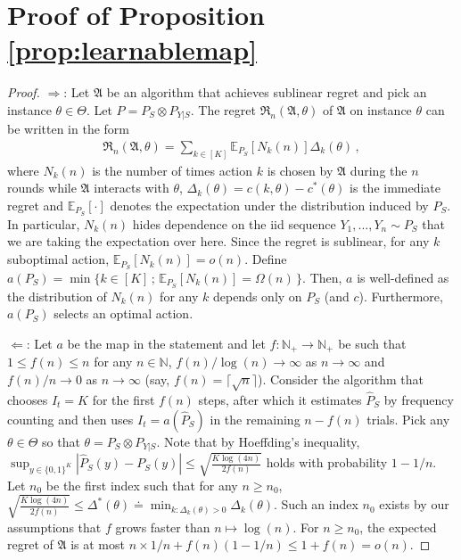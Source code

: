 \documentclass[11pt]{article} %
\newcommand{\N}{\mathbb{N}}
\newcommand{\Alg}{\mathfrak{A}}
\newcommand{\EEi}[2]{\mathbb{E}_{#1}\left[#2\right]}
\newcommand{\Regret}{\mathfrak{R}}
\begin{document}
\section*{Proof of Proposition \ref{prop:learnablemap}}
\begin{proof}
	$\Rightarrow$: Let $\Alg$ be an algorithm that achieves sublinear regret
	and pick  an instance  $\theta \in\Theta$. Let $P = P_S \otimes P_{Y|S}$.
	The regret $\Regret_n(\Alg,\theta)$ of $\Alg$ on instance $\theta$ can be written in the form
	\begin{align*}
	\Regret_n(\Alg,\theta) = \sum_{k\in [K]} \EEi{P_S}{N_k(n)} \Delta_k(\theta)\,,
	\end{align*}
	where $N_k(n)$ is the number of times action $k$ is chosen by $\Alg$ during the $n$ rounds while
	$\Alg$ interacts with $\theta$, $\Delta_k(\theta) = c(k,\theta) - c^*(\theta)$ is the immediate regret
	and $\EEi{P_S}{\cdot}$ denotes the expectation under the distribution induced by $P_S$.
	In particular, $N_k(n)$ hides dependence on the iid sequence $Y_1,\dots,Y_n \sim P_S$ 
	that we are taking the expectation over here. 
	Since the regret is sublinear, for any $k$ suboptimal action, $\EEi{P_S}{N_k(n)} = o(n)$. 
	Define $a(P_S) = \min \{ k\in [K]\,;\, \EEi{P_S}{N_k(n)} = \Omega(n) \,\}$. Then, $a$ is well-defined as the distribution of $N_k(n)$ for any $k$ depends only on $P_S$ (and $c$). Furthermore, $a(P_S)$ selects an optimal action.
	
	$\Leftarrow$: Let $a$ be the map in the statement and let $f:\N_+\to\N_+$ be such that $1\le f(n)\le n$ for any  $n\in \N$,
	$f(n)/\log(n) \to \infty$ as $n\to \infty$ and $f(n)/n \to 0$ as $n\to \infty$ (say, $f(n) = \lceil \sqrt{n} \rceil$).
	Consider the algorithm that chooses $I_t = K$ for the first $f(n)$ steps, after which it estimates $\hat{P}_S$ by
	frequency counting and then uses $I_t = a(\hat{P}_S)$ in the remaining $n-f(n)$ trials. 
	Pick any $\theta \in \Theta$ so that $\theta = P_S \otimes P_{Y|S}$. 
	Note that by Hoeffding's inequality, 
	$\sup_{y\in \{0,1\}^K} |\hat{P}_S(y)  - P_S(y)| \le \sqrt{\frac{K\log(4n)}{2f(n)}}$ holds with probability $1-1/n$.
	Let $n_0$ be the first index such that for any $n\ge n_0$,
	$\sqrt{\frac{K\log(4n)}{2f(n)}}\le \Delta^*(\theta) \doteq \min_{k:\Delta_k(\theta)>0} \Delta_k(\theta)$.
	Such an index $n_0$ exists by our assumptions that $f$ grows faster than $n \mapsto \log(n)$.
	For $n\ge n_0$, the expected regret of $\Alg$ is at most $n \times 1/n + f(n) (1-1/n) \le 1+f(n) = o(n)$.
	\end{proof}
\end{document}
